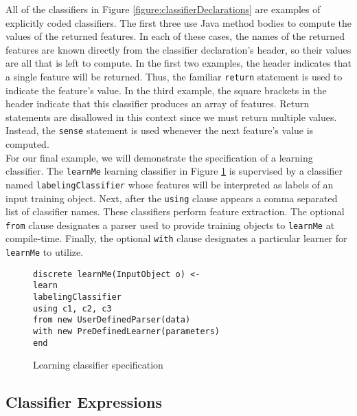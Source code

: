 All of the classifiers in Figure \ref{figure:classifierDeclarations} are
examples of explicitly coded classifiers.  The first three use Java method
bodies to compute the values of the returned features.  In each of these
cases, the names of the returned features are known directly from the
classifier declaration's header, so their values are all that is left to
compute.  In the first two examples, the header indicates that a single
feature will be returned.  Thus, the familiar {\tt return} statement is used
to indicate the feature's value.  In the third example, the square brackets in
the header indicate that this classifier produces an array of features.
Return statements are disallowed in this context since we must return
multiple values.  Instead, the {\tt sense} statement is used whenever the
next feature's value is computed. \\

For our final example, we will demonstrate the specification of a learning
classifier.  The {\tt learnMe} learning classifier in Figure
\ref{figure:learnMe} is supervised by a classifier named
{\tt labelingClassifier} whose features will be interpreted as labels of an
input training object.  Next, after the {\tt using} clause appears a comma
separated list of classifier names.  These classifiers perform feature
extraction.  The optional {\tt from} clause designates a parser used to
provide training objects to {\tt learnMe} at compile-time.  Finally, the
optional {\tt with} clause designates a particular learner for {\tt learnMe}
to utilize.

\begin{figure}
\begin{center}
\begin{algorithm}
    {\tt discrete learnMe(InputObject o) <-}
\\  {\tt learn} \+
\\  {\tt  labelingClassifier}
\\  {\tt  using c1, c2, c3}
\\  {\tt  from new UserDefinedParser(data)}
\\  {\tt  with new PreDefinedLearner(parameters)} \-
\\  {\tt end}
\end{algorithm}
\end{center}
\caption{Learning classifier specification}
\label{figure:learnMe}
\end{figure}

\subsection{Classifier Expressions} \label{section:classifierExpressions}

